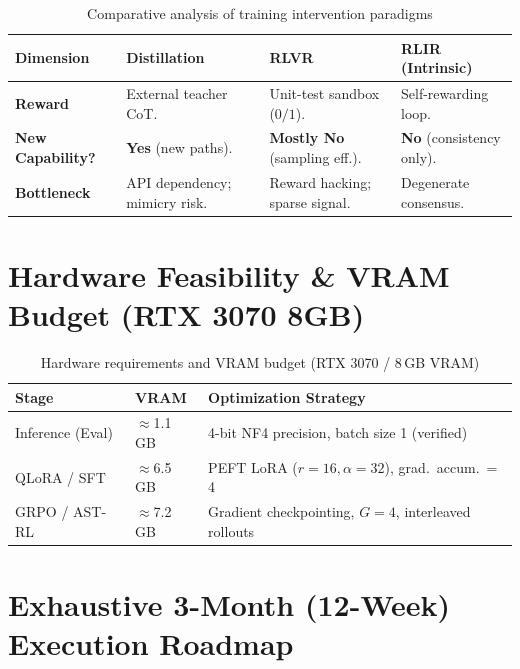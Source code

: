 \documentclass[12pt, a4paper]{article}
\begin{document}
\begin{table}[ht!]
\centering
\caption{Comparative analysis of training intervention paradigms}
\label{tab:interventions}
\renewcommand{\arraystretch}{1.3}
{\small
\begin{tabularx}{\textwidth}{l X X X}
\toprule
\textbf{Dimension} & \textbf{Distillation} & \textbf{RLVR} & \textbf{RLIR (Intrinsic)} \\
\midrule
\textbf{Reward} & External teacher CoT. & Unit-test sandbox ($0/1$). & Self-rewarding loop. \\
\textbf{New Capability?} & \textbf{Yes} (new paths). & \textbf{Mostly No} (sampling eff.). & \textbf{No} (consistency only). \\
\textbf{Bottleneck} & API dependency; mimicry risk. & Reward hacking; sparse signal. & Degenerate consensus. \\
\bottomrule
\end{tabularx}
}
\end{table}

\section{Hardware Feasibility \& VRAM Budget (RTX 3070 8GB)}

\begin{table}[ht!]
\centering
\caption{Hardware requirements and VRAM budget (RTX 3070 / 8\,GB VRAM)}
\label{tab:hardware}
\renewcommand{\arraystretch}{1.3}
{\small
\begin{tabularx}{\textwidth}{l l X}
\toprule
\textbf{Stage} & \textbf{VRAM} & \textbf{Optimization Strategy} \\
\midrule
Inference (Eval) & {$\approx$}1.1\,GB & 4-bit NF4 precision, batch size 1 (verified) \\
QLoRA / SFT & {$\approx$}6.5\,GB & PEFT LoRA ($r{=}16, \alpha{=}32$), grad.\ accum.\ = 4 \\
GRPO / AST-RL & {$\approx$}7.2\,GB & Gradient checkpointing, $G{=}4$, interleaved rollouts \\
\bottomrule
\end{tabularx}
}
\end{table}

\section{Exhaustive 3-Month (12-Week) Execution Roadmap}
\end{document}
